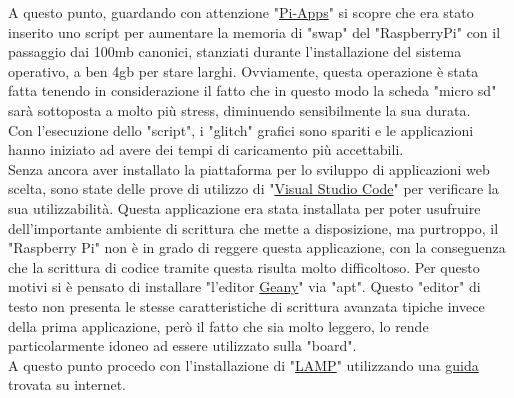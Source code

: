 A questo punto, guardando con attenzione "\href{https://pi-apps.io/}{Pi-Apps}" si scopre che era stato inserito uno script per aumentare la memoria di "swap" del "RaspberryPi" con il passaggio dai 100mb canonici, stanziati durante l'installazione del sistema operativo, a ben 4gb per stare larghi. Ovviamente, questa operazione è stata fatta tenendo in considerazione il fatto che in questo modo la scheda "micro sd" sarà sottoposta a molto più stress, diminuendo sensibilmente la sua durata.\\
Con l'esecuzione dello "script", i "glitch" grafici sono spariti e le applicazioni hanno iniziato ad avere dei tempi di caricamento più accettabili.\\
Senza ancora aver installato la piattaforma per lo sviluppo di applicazioni web scelta, sono state delle prove di utilizzo di "\href{https://code.visualstudio.com/}{Visual Studio Code}" per verificare la sua utilizzabilità. Questa applicazione era stata installata per poter usufruire dell'importante ambiente di scrittura che mette a disposizione, ma purtroppo, il "Raspberry Pi" non è in grado di reggere questa applicazione, con la conseguenza che la scrittura di codice tramite questa risulta molto difficoltoso. Per questo motivi si è pensato di installare "l'editor \href{https://www.geany.org/}{Geany}" via "apt". Questo "editor" di testo non presenta le stesse caratteristiche di scrittura avanzata tipiche invece della prima applicazione, però il fatto che sia molto leggero, lo rende particolarmente idoneo ad essere utilizzato sulla "board".\\
A questo punto procedo con l'installazione di "\href{https://it.wikipedia.org/wiki/LAMP}{LAMP}" utilizzando una \href{https://randomnerdtutorials.com/raspberry-pi-apache-mysql-php-lamp-server/}{guida} trovata su internet. 


